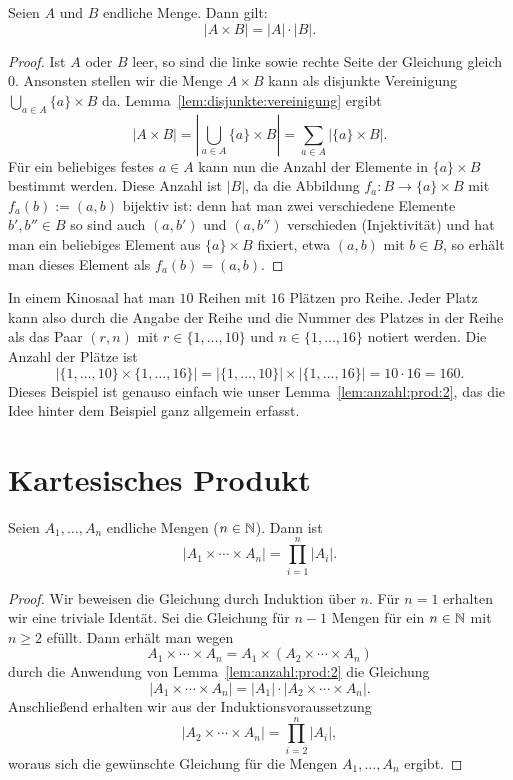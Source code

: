 \begin{lem} \label{lem:anzahl:prod:2}
	Seien $A$ und $B$ endliche Menge. Dann gilt: 
	\[
		|A \times B| = |A| \cdot |B|. 
	\]
\end{lem}
\begin{proof} 
	Ist $A$ oder $B$ leer, so sind die linke sowie rechte Seite der Gleichung gleich $0$. Ansonsten stellen wir die Menge $A \times B$ kann als disjunkte Vereinigung $\bigcup_{a \in A} \{a\} \times B$ da. Lemma~\ref{lem:disjunkte:vereinigung} ergibt
	\[
		|A \times B| = \left| \bigcup_{a \in A} \{a \} \times B \right| = \sum_{a \in A} | \{a \} \times B |.
	\]
	Für ein beliebiges festes $a \in A$ kann nun die Anzahl der Elemente in $\{a\} \times B$ bestimmt werden. Diese Anzahl ist $|B|$, da die Abbildung $f_a : B \to \{a\} \times B$ mit $f_a(b) := (a,b)$ bijektiv ist: denn hat man zwei verschiedene Elemente $b',b'' \in B$ so sind auch $(a,b')$ und $(a,b'')$ verschieden (Injektivität) und hat man ein beliebiges Element aus $\{a\} \times B$ fixiert, etwa $(a,b)$ mit $b \in B$, so erhält man dieses Element als $f_a(b) = (a,b)$. 
\end{proof} 

\begin{bsp}
	In einem Kinosaal hat man $10$ Reihen mit $16$ Plätzen pro Reihe. Jeder Platz kann also durch die Angabe der Reihe und die Nummer des Platzes in der Reihe als das Paar $(r,n)$ mit $r \in \{1,\ldots,10\}$ und $n \in \{1,\ldots,16\}$ notiert werden. Die Anzahl der Plätze ist 
	\[
			| \{1,\ldots,10\} \times \{1,\ldots,16\} |  = | \{1,\ldots,10\} | \times | \{1,\ldots,16\}| = 10 \cdot 16 = 160. 
	\]
	Dieses Beispiel ist genauso einfach wie unser Lemma~\ref{lem:anzahl:prod:2}, das die Idee hinter dem Beispiel ganz allgemein erfasst. 
\end{bsp} 
 

\section{Kartesisches Produkt} 

\begin{thm} \label{thm:kreuz:produkt}
	Seien $A_1,\ldots, A_n$ endliche Mengen ($n \in \mathbb{N}$). Dann ist 
	\[
		|A_1 \times \cdots \times A_n|  = \prod_{i=1}^n |A_i|. 
	\]
\end{thm} 
\begin{proof}
	Wir beweisen die Gleichung durch Induktion über $n$.
	Für $n=1$ erhalten wir eine triviale Identät. Sei die Gleichung für $n-1$ Mengen für ein $n \in \mathbb{N}$ mit $n \ge 2$ efüllt. Dann erhält man wegen 
	\[
			A_1 \times \cdots \times A_n = A_1 \times (A_2 \times \cdots \times A_n)
	\]
	durch die Anwendung von Lemma~\ref{lem:anzahl:prod:2} die Gleichung 
	\[
		|A_1 \times \cdots \times A_n | = |A_1| \cdot |A_2 \times \cdots \times A_n|. 
	\]
	Anschließend erhalten wir aus der Induktionsvoraussetzung 
	\[
		|A_2 \times \cdots \times A_n| = \prod_{i=2}^n |A_i|,
	\]
	woraus sich die gewünschte Gleichung für die Mengen $A_1,\ldots,A_n$ ergibt. 
\end{proof} 


